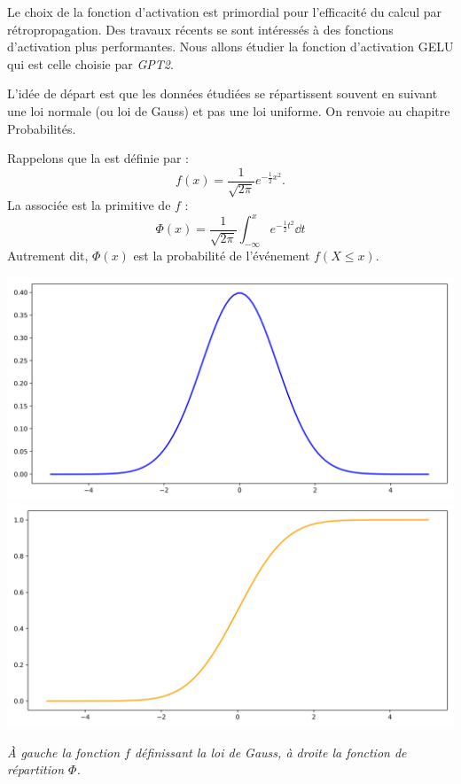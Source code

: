 \documentclass[11pt,class=report,crop=false]{standalone}
\begin{document}
Le choix de la fonction d'activation est primordial pour l'efficacité du calcul par rétropropagation.
Des travaux récents se sont intéressés à des fonctions d'activation plus performantes.
Nous allons étudier la fonction d'activation GELU qui est celle choisie par \emph{GPT2}.

L'idée de départ est que les données étudiées se répartissent souvent en suivant une loi normale (ou loi de Gauss) et pas une loi uniforme. 
On renvoie au chapitre \og{}Probabilités\fg{}.

Rappelons que la  est définie par :
$$f(x) = \frac{1}{\sqrt{2\pi}} e^{-\frac12 x^2}.$$
La  associée est la primitive de $f$ :
$$\Phi(x) = \frac{1}{\sqrt{2\pi}} \int_{-\infty}^x e^{-\frac12 t^2} \dd t$$
Autrement dit, $\Phi(x)$ est la probabilité de l'événement $f(X \le x)$.


\begin{center}
	\includegraphics[scale=\myscale,scale=0.3]{figures/gelu01}\quad 
	\includegraphics[scale=\myscale,scale=0.3]{figures/gelu02}	
	
	
	\emph{À gauche la fonction $f$ définissant la loi de Gauss, à droite la fonction de répartition $\Phi$.}
	
\end{center}
\end{document}
